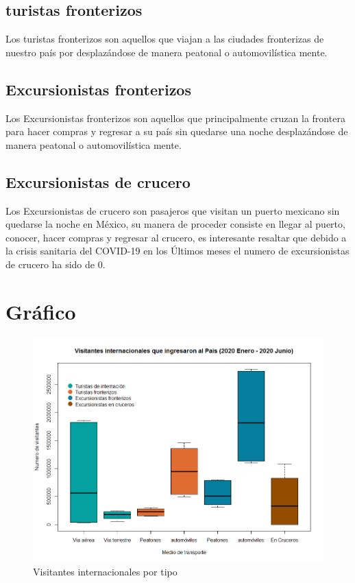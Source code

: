 \documentclass[]{article}
\begin{document}
	\subsection{turistas fronterizos}
Los turistas fronterizos son aquellos que viajan a las ciudades fronterizas de nuestro país por desplazándose de manera peatonal o automovilística mente.

	\subsection{Excursionistas fronterizos}
Los Excursionistas fronterizos son aquellos que principalmente cruzan la frontera para hacer compras y regresar a su país sin quedarse una noche desplazándose de manera peatonal o automovilística mente.

	\subsection{Excursionistas de crucero}
	Los Excursionistas de crucero son pasajeros que visitan un puerto mexicano sin quedarse la noche en México, su manera de proceder consiste en llegar al puerto, conocer, hacer compras y regresar al crucero, es interesante resaltar que debido a la crisis sanitaria del COVID-19 en los Últimos meses el numero de excursionistas de crucero ha sido de 0.
\section{Gráfico}	
	\begin{figure}[h]
    	\centering
    	\includegraphics[scale=.5]{Turismo}
    	\caption{Visitantes internacionales por tipo}
    	\label{fig:mesh}
	\end{figure}

\printbibliography[title={Referencias}]
\end{document}
